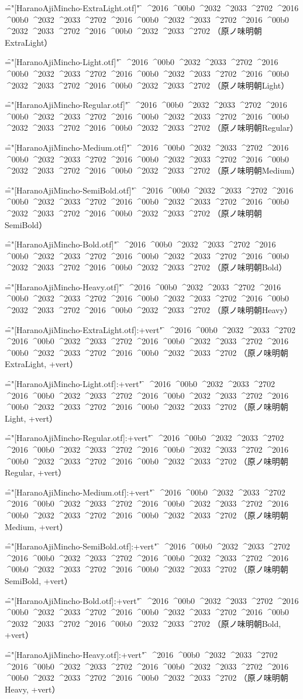 
\nopagenumbers

\def\test{%
^^^^2016%
^^^^00b0%
^^^^2032%
^^^^2033%
^^^^2702}

\def\testAll{\test \test \test \test \test}


\font\f="[HaranoAjiMincho-ExtraLight.otf]" \f
\testAll
（原ノ味明朝ExtraLight）\par

\font\f="[HaranoAjiMincho-Light.otf]" \f
\testAll
（原ノ味明朝Light）\par

\font\f="[HaranoAjiMincho-Regular.otf]" \f
\testAll
（原ノ味明朝Regular）\par

\font\f="[HaranoAjiMincho-Medium.otf]" \f
\testAll
（原ノ味明朝Medium）\par

\font\f="[HaranoAjiMincho-SemiBold.otf]" \f
\testAll
（原ノ味明朝SemiBold）\par

\font\f="[HaranoAjiMincho-Bold.otf]" \f
\testAll
（原ノ味明朝Bold）\par

\font\f="[HaranoAjiMincho-Heavy.otf]" \f
\testAll
（原ノ味明朝Heavy）\par


\font\f="[HaranoAjiMincho-ExtraLight.otf]:+vert" \f
\testAll
（原ノ味明朝ExtraLight, +vert）\par

\font\f="[HaranoAjiMincho-Light.otf]:+vert" \f
\testAll
（原ノ味明朝Light, +vert）\par

\font\f="[HaranoAjiMincho-Regular.otf]:+vert" \f
\testAll
（原ノ味明朝Regular, +vert）\par

\font\f="[HaranoAjiMincho-Medium.otf]:+vert" \f
\testAll
（原ノ味明朝Medium, +vert）\par

\font\f="[HaranoAjiMincho-SemiBold.otf]:+vert" \f
\testAll
（原ノ味明朝SemiBold, +vert）\par

\font\f="[HaranoAjiMincho-Bold.otf]:+vert" \f
\testAll
（原ノ味明朝Bold, +vert）\par

\font\f="[HaranoAjiMincho-Heavy.otf]:+vert" \f
\testAll
（原ノ味明朝Heavy, +vert）\par


